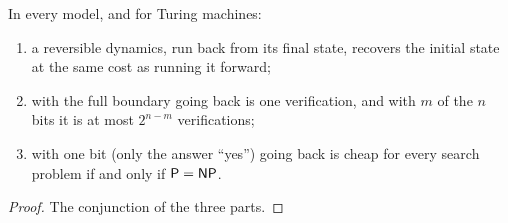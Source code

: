 \begin{theorem}[Localization]
  \label{thm:localization}
  \leanok
  In every model, and for Turing machines:
  \begin{enumerate}
    \item a reversible dynamics, run back from its final state, recovers the initial state at the
      same cost as running it forward;
    \item with the full boundary going back is one verification, and with $m$ of the $n$ bits it is at
      most $2^{n-m}$ verifications;
    \item with one bit (only the answer ``yes'') going back is cheap for every search problem if and
      only if $\mathsf{P} = \mathsf{NP}$.
  \end{enumerate}
  \own{}
\end{theorem}

\begin{proof}
  \leanok
  The conjunction of the three parts.
\end{proof}
